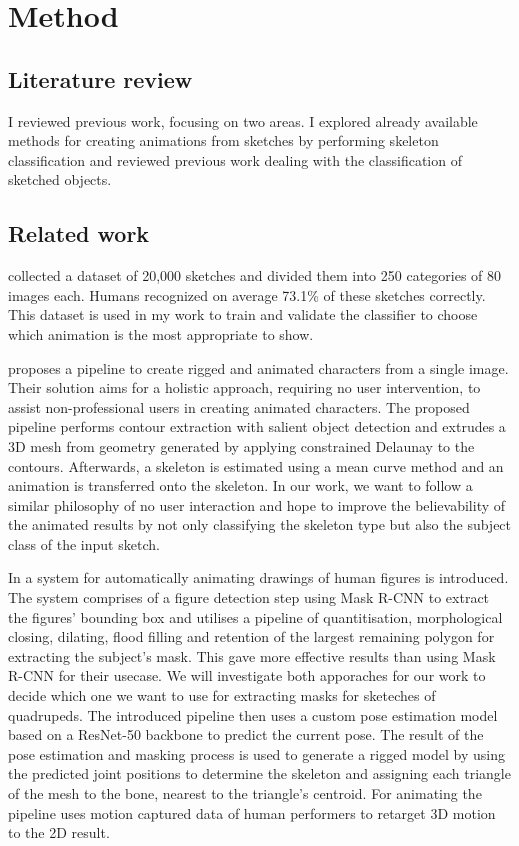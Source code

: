 \chapter{Method}
\label{ch:method}

\section*{Literature review}
I reviewed previous work, focusing on two areas. I explored already available
methods for creating animations from sketches by performing skeleton
classification and reviewed previous work dealing with the classification of
sketched objects.

\section*{Related work}
\textcite{eitz2012hdhso} collected a dataset of 20,000 sketches and divided them
into 250 categories of 80 images each. Humans recognized on average 73.1\% of 
these sketches correctly. This dataset is used in my work to train and validate
the classifier to choose which animation is the most appropriate to show.

\textcite{10.1145/3469877.3490565} proposes a pipeline to create rigged and
animated characters from a single image. Their solution aims for a holistic
approach, requiring no user intervention, to assist non-professional users in
creating animated characters. The proposed pipeline performs contour extraction
with salient object detection and extrudes a 3D mesh from geometry generated by
applying constrained Delaunay to the contours. Afterwards, a skeleton is
estimated using a mean curve method and an animation is transferred onto the
skeleton. In our work, we want to follow a similar philosophy of no user
interaction and hope to improve the believability of the animated results by not
only classifying the skeleton type but also the subject class of the input
sketch.

In \textcite{10.1145/3592788} a system for automatically animating drawings of
human figures is introduced. The system comprises of a figure detection step
using Mask R-CNN \Textcite{he2018mask} to extract the figures' bounding box and
utilises a pipeline of quantitisation, morphological closing, dilating,
flood filling and retention of the largest remaining polygon for extracting the
subject's mask. This gave more effective results than using Mask R-CNN for their
usecase. We will investigate both apporaches for our work to decide which one we
want to use for extracting masks for sketeches of quadrupeds. The introduced
pipeline then uses a custom pose estimation model based on a ResNet-50 backbone
to predict the current pose. The result of the pose estimation and masking
process is used to generate a rigged model by using the predicted joint
positions to determine the skeleton and assigning each triangle of the mesh to
the bone, nearest to the triangle's centroid. For animating the pipeline uses
motion captured data of human performers to retarget 3D motion to the 2D result.

